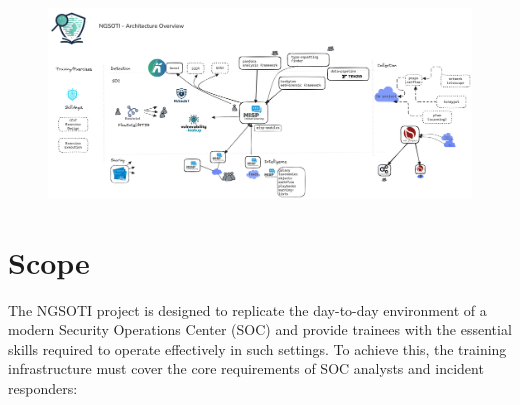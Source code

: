\documentclass[10pt,a4paper]{report}
\begin{document}
\begin{figure}[h]
\includegraphics[scale=0.11]{oss-overview.png}
\end{figure}

\section{Scope}

The NGSOTI project is designed to replicate the day-to-day environment of a
modern Security Operations Center (SOC) and provide trainees with the
essential skills required to operate effectively in such settings. To achieve
this, the training infrastructure must cover the core requirements of SOC
analysts and incident responders:
\end{document}

